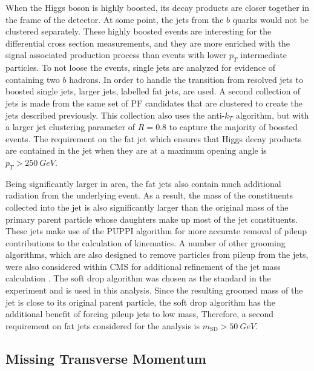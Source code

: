 When the Higgs boson is highly boosted, its decay products are closer together
in the frame of the detector.
At some point, the jets from the $b$ quarks would not be clustered separately.
These highly boosted events are interesting for the differential cross section measurements,
and they are more enriched with the signal associated production process than
events with lower $p_T$ intermediate particles.
To not loose the events, single jets are analyzed for evidence of containing two $b$ hadrons.
In order to handle the transition from resolved jets to boosted single jets,
larger jets, labelled fat jets, are used.
A second collection of jets is made from the same set of PF candidates that are
clustered to create the jets described previously.
This collection also uses the anti-$k_T$ algorithm,
but with a larger jet clustering parameter of $R = 0.8$ to capture the majority of boosted events.
The requirement on the fat jet which ensures that Higgs decay products are contained
in the jet when they are at a maximum opening angle is $p_T > \SI{250}{GeV}$.

Being significantly larger in area,
the fat jets also contain much additional radiation from the underlying event.
As a result, the mass of the constituents collected into the jet
is also significantly larger than the original mass of the primary parent particle
whose daughters make up most of the jet constituents.
These jets make use of the PUPPI algorithm \cite{bertolini2014pileup} for
more accurate removal of pileup contributions to the calculation of kinematics.
A number of other grooming algorithms,
which are also designed to remove particles from pileup from the jets,
were also considered within CMS for additional refinement of the jet mass calculation \cite{dabercro2014}.
The soft drop algorithm \cite{Larkoski_2014} was chosen as the standard in the experiment
and is used in this analysis.
Since the resulting groomed mass of the jet is close to its original parent particle,
the soft drop algorithm has the additional benefit of forcing pileup jets to low mass,
Therefore, a second requirement on fat jets considered for the analysis is $m_\mathrm{SD} > \SI{50}{GeV}$.

\subsection{Missing Transverse Momentum}

